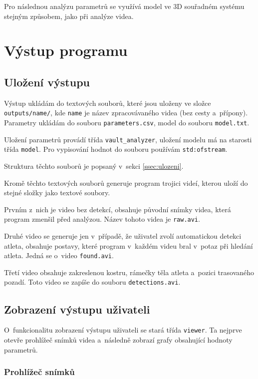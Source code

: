 Pro následnou analýzu parametrů se využívá model ve 3D souřadném systému stejným způsobem, jako při analýze videa.



\section{Výstup programu}

\subsection{Uložení výstupu}

Výstup ukládám do textových souborů, které jsou uloženy ve složce \texttt{outputs/\allowbreak name/}, kde \texttt{name} je název zpracovávaného videa (bez cesty a~přípony). Parametry ukládám do souboru \texttt{parameters.csv}, model do souboru \texttt{model.txt}.

Uložení parametrů provádí třída \texttt{vault\_analyzer}, uložení modelu má na starosti třída \texttt{model}. Pro vypisování hodnot do souboru používám \texttt{std\::ofstream}.

Struktura těchto souborů je popsaný v~sekci \ref{ssec:ulozeni}.

Kromě těchto textových souborů generuje program trojici videí, kterou uloží do stejné složky jako textové soubory.

Prvním z~nich je video bez detekcí, obsahuje původní snímky videa, která program zmenšil před analýzou. Název tohoto videa je \texttt{raw.avi}.

Druhé video se generuje jen v~případě, že uživatel zvolí automatickou detekci atleta, obsahuje postavy, které program v~každém videu bral v~potaz při hledání atleta. Jedná se o~video \texttt{found.avi}.

Třetí video obsahuje zakreslenou kostru, rámečky těla atleta a~pozici trasovaného pozadí. Toto video se zapíše do souboru \texttt{detections.avi}.



\subsection{Zobrazení výstupu uživateli}

O~funkcionalitu zobrazení výstupu uživateli se stará třída \texttt{viewer}. Ta nejprve otevře prohlížeč snímků videa a~následně zobrazí grafy obsahující hodnoty parametrů.


\subsubsection{Prohlížeč snímků}


